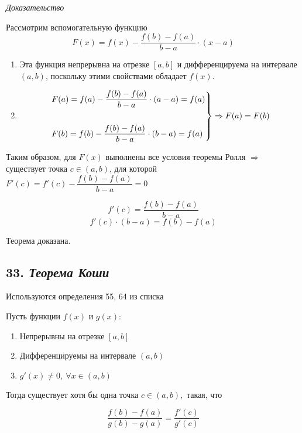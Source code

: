 \textit{Доказательство}

Рассмотрим вспомогательную функцию $$F(x) = f(x) - \dfrac{f(b) - f(a)}{b - a}\cdot (x - a)$$
\begin{enumerate}

\item Эта функция непрерывна на отрезке $[a, b]$ и дифференцируема на интервале $(a, b)$, поскольку этими свойствами обладает $f(x)$.
\item $$\begin{rcases}
    F(a) =f(a) - {\dfrac{f(b) - f(a)}{b - a}}\cdot (a - a) = f(a)\\\\
    F(b) = f(b) - {\dfrac{f(b) - f(a)}{b - a}}\cdot (b - a) = f(a)
    \end{rcases} \Rightarrow F(a) = F(b)
    $$

\end{enumerate}

Таким образом, для $F(x)$ выполнены все условия теоремы Ролля $\Rightarrow$ существует точка $c \in (a, b)$, для которой $F'(c) = f'(c) - {\dfrac{f(b) - f(a)}{b - a}}= 0$

$$f'(c) = {\dfrac{f(b) - f(a)}{b - a}}$$ $$f'(c)\cdot (b - a) = f(b) - f(a)$$

Теорема доказана.
\newpage 
\subsection*{33. \textit{Теорема Коши}}
\begin{Quote2} 
\small\centering 

Используются определения 55, 64 из списка \end{Quote2} 

Пусть функции $f(x)$ и $g(x)$:
\begin{enumerate}

\item Непрерывны на отрезке $[a, b]$
\item Дифференцируемы на интервале $(a, b)$
\item $g'(x) \neq 0, \ \forall x \in (a, b)$

\end{enumerate}

Тогда существует хотя бы одна точка $c \in (a, b),$ такая, что

$$
\dfrac{f(b) - f(a)}{g(b)-g(a)} = \dfrac{f'(c)}{g'(c)}
$$
\vspace*{20pt} 

